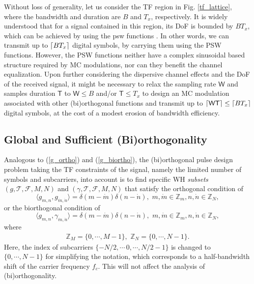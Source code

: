 \documentclass[journal]{IEEEtran}
\DeclarePairedDelimiter\ceil{\lceil}{\rceil}
\begin{document}
Without loss of generality, let us consider the TF region in Fig. \ref{tf_lattice}, where the bandwidth and duration are $B$ and $T_x$, respectively.
It is widely understood that for a signal contained in this region, its DoF is bounded by $BT_x$, which can be achieved {by} using the \ac{psw} functions \cite{landau62}. In other words, we can transmit up to $\ceil{BT_x}$ digital symbols, by carrying them using the PSW functions. However, the PSW functions 
neither have a complex sinusoidal based structure required by MC {modulations, nor can they} benefit the channel equalization. Upon further considering the dispersive channel effects and the DoF of the received signal, it might be necessary to relax the sampling rate $\mathsf W$ and samples duration $\mathsf T$ to $\mathsf W \le B$ and/or $\mathsf T \le T_x$ to design an MC modulation associated with other (bi)orthogonal functions and transmit up to $\ceil{\mathsf W\mathsf T}\le \ceil{BT_x}$ digital symbols, at the cost of a modest erosion of bandwidth efficiency.



\subsection{Global and Sufficient (Bi)orthogonality}
Analogous to (\ref{g_ortho}) and (\ref{g_biortho}), the (bi)orthogonal pulse design problem taking the {TF constraints of the signal, namely the limited number of symbols and subcarriers,}
into account is
to find specific WH \emph{subsets} $ \left(g,\mathcal T, \mathcal F, M, N\right)$ and $ \left(\gamma ,\mathcal T, \mathcal F, M, N\right)$ that satisfy the orthogonal condition of
\begin{equation}\label{l_ortho}
  \langle g_{m,n}, g_{\dot m,\dot n}\rangle =\delta(m-\dot m)\delta(n-\dot n),\,\, m,\dot m\in \mathbb Z_m, n,\dot n\in \mathbb Z_N,
\end{equation}
or the biorthogonal condition of
\begin{equation}\label{l_biortho}
  \langle g_{m,n}, \gamma_{\dot m,\dot n}\rangle =\delta(m-\dot m)\delta(n-\dot n),\,\, m,\dot m\in \mathbb Z_m, n,\dot n\in \mathbb Z_N,
\end{equation}
where
\begin{align}
  \mathbb Z_M =\{0, \cdots, M-1\}, \,\, \mathbb Z_N =\{0, \cdots, N-1\}.
\end{align}
Here, the index of subcarriers $\{-N/2,\cdots\, 0,\cdots, N/2-1\}$ is changed to $\{0,\cdots, N-1\}$ for simplifying the notation, which corresponds to a half-bandwidth shift of the carrier frequency $f_c$. This will not affect the analysis of (bi)orthogonality.
\end{document}
